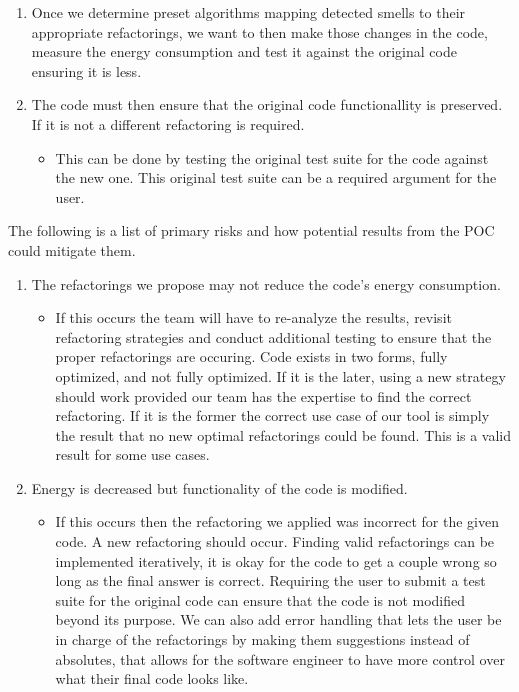 \documentclass{article}
\begin{document}
\begin{enumerate}
\begin{itemize}
  \end{itemize} 
  \item Once we determine preset algorithms mapping detected smells to their appropriate refactorings, we want to then make those changes in the code, measure the energy consumption and test it against the original code ensuring it is less.
  \item The code must then ensure that the original code functionallity is preserved. If it is not a different refactoring is required. 
  \begin{itemize}
    \item This can be done by testing the original test suite for the code against the new one. This original test suite can be a required argument for the user.
  \end{itemize} 
\end{enumerate}


The following is a list of primary risks and how potential results from the POC could mitigate them.
\begin{enumerate}

  \item The refactorings we propose may not reduce the code's energy consumption.
  \begin{itemize}
    \item If this occurs the team will have to re-analyze the results, revisit refactoring strategies and conduct additional testing to ensure that the proper refactorings are occuring. Code exists in two forms, fully optimized, and not fully optimized. If it is the later, using a new strategy should work provided our team has the expertise to find the correct refactoring. If it is the former the correct use case of our tool is simply the result that no new optimal refactorings could be found. This is a valid result for some use cases.
  \end{itemize} 

  \item Energy is decreased but functionality of the code is modified. 
  \begin{itemize}
    \item If this occurs then the refactoring we applied was incorrect for the given code. A new refactoring should occur. Finding valid refactorings can be implemented iteratively, it is okay for the code to get a couple wrong so long as the final answer is correct. Requiring the user to submit a test suite for the original code can ensure that the code is not modified beyond its purpose. We can also add error handling that lets the user be in charge of the refactorings by making them suggestions instead of absolutes, that allows for the software engineer to have more control over what their final code looks like.
  \end{itemize} 

\end{enumerate}
\end{document}
